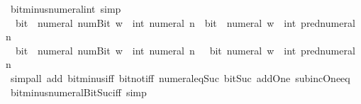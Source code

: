 \begin{isabellebody}
\isanewline
\isanewline
{}\isamarkupfalse%
\ bit{\isacharunderscore}{\kern0pt}minus{\isacharunderscore}{\kern0pt}numeral{\isacharunderscore}{\kern0pt}int\ {\isacharbrackleft}{\kern0pt}simp{\isacharbrackright}{\kern0pt}{\isacharcolon}{\kern0pt}\isanewline
\ \ {\isacartoucheopen}bit\ {\isacharparenleft}{\kern0pt}{\isacharminus}{\kern0pt}\ numeral\ {\isacharparenleft}{\kern0pt}num{\isachardot}{\kern0pt}Bit{}\ w{\isacharparenright}{\kern0pt}\ {\isacharcolon}{\kern0pt}{\isacharcolon}{\kern0pt}\ int{\isacharparenright}{\kern0pt}\ {\isacharparenleft}{\kern0pt}numeral\ n{\isacharparenright}{\kern0pt}\ {\isasymlongleftrightarrow}\ bit\ {\isacharparenleft}{\kern0pt}{\isacharminus}{\kern0pt}\ numeral\ w\ {\isacharcolon}{\kern0pt}{\isacharcolon}{\kern0pt}\ int{\isacharparenright}{\kern0pt}\ {\isacharparenleft}{\kern0pt}pred{\isacharunderscore}{\kern0pt}numeral\ n{\isacharparenright}{\kern0pt}{\isacartoucheclose}\isanewline
\ \ {\isacartoucheopen}bit\ {\isacharparenleft}{\kern0pt}{\isacharminus}{\kern0pt}\ numeral\ {\isacharparenleft}{\kern0pt}num{\isachardot}{\kern0pt}Bit{}\ w{\isacharparenright}{\kern0pt}\ {\isacharcolon}{\kern0pt}{\isacharcolon}{\kern0pt}\ int{\isacharparenright}{\kern0pt}\ {\isacharparenleft}{\kern0pt}numeral\ n{\isacharparenright}{\kern0pt}\ {\isasymlongleftrightarrow}\ {\isasymnot}\ bit\ {\isacharparenleft}{\kern0pt}numeral\ w\ {\isacharcolon}{\kern0pt}{\isacharcolon}{\kern0pt}\ int{\isacharparenright}{\kern0pt}\ {\isacharparenleft}{\kern0pt}pred{\isacharunderscore}{\kern0pt}numeral\ n{\isacharparenright}{\kern0pt}{\isacartoucheclose}\isanewline
%
\isadelimproof
\ \ %
\endisadelimproof
%
\isatagproof
{}\isamarkupfalse%
\ {\isacharparenleft}{\kern0pt}simp{\isacharunderscore}{\kern0pt}all\ add{\isacharcolon}{\kern0pt}\ bit{\isacharunderscore}{\kern0pt}minus{\isacharunderscore}{\kern0pt}iff\ bit{\isacharunderscore}{\kern0pt}not{\isacharunderscore}{\kern0pt}iff\ numeral{\isacharunderscore}{\kern0pt}eq{\isacharunderscore}{\kern0pt}Suc\ bit{\isacharunderscore}{\kern0pt}Suc\ add{\isacharunderscore}{\kern0pt}One\ sub{\isacharunderscore}{\kern0pt}inc{\isacharunderscore}{\kern0pt}One{\isacharunderscore}{\kern0pt}eq{\isacharparenright}{\kern0pt}%
\endisatagproof
{\isafoldproof}%
%
\isadelimproof
\isanewline
%
\endisadelimproof
\isanewline
{}\isamarkupfalse%
\ bit{\isacharunderscore}{\kern0pt}minus{\isacharunderscore}{\kern0pt}numeral{\isacharunderscore}{\kern0pt}Bit{}{\isacharunderscore}{\kern0pt}Suc{\isacharunderscore}{\kern0pt}iff\ {\isacharbrackleft}{\kern0pt}simp{\isacharbrackright}{\kern0pt}{\isacharcolon}{\kern0pt}\isanewline

\end{isabellebody}
